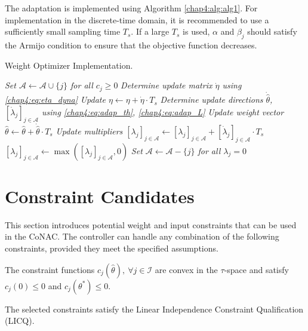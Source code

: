 The adaptation is implemented using Algorithm \ref{chap4:alg:alg1}. For implementation in the discrete-time domain, it is recommended to use a sufficiently small sampling time $T_s$. If a large $T_s$ is used, $\alpha$ and $\beta_j$ should satisfy the Armijo condition \cite[Chap.~3 eq.~(3.4)]{RN9} to ensure that the objective function decreases.

\begin{algorithm}[t]
    \caption{Weight Optimizer Implementation.}\label{chap4:alg:alg1}
        \BlankLine
        \emph{Set $\mathcal A \leftarrow \mathcal A\cup \{j\}$ for all $c_j\ge0$}\;
        \emph{Determine update matrix $\dot\eta$ using \eqref{chap4:eq:eta_dyna}}\;
        \emph{Update $\eta\leftarrow \eta +\dot\eta\cdot T_s$}\; 
        \emph{Determine update directions $\dot{\hat\theta}$, $[\dot\lambda_j]_{j\in\mathcal A}$ using \eqref{chap4:eq:adap_th}, \eqref{chap4:eq:adap_L}}\;
        \emph{Update weight vector $\hat\theta\leftarrow \hat\theta+\dot{\hat\theta}\cdot T_s$}\;
        \emph{Update multipliers $[\lambda_j]_{j\in\mathcal A}\leftarrow [\lambda_j]_{j\in\mathcal A}+[\dot\lambda_j]_{j\in\mathcal A}\cdot T_s$}\;
        \emph{$[\lambda_j]_{j\in\mathcal A}\leftarrow \max([\lambda_j]_{j\in\mathcal A}, 0)$}\;
        \emph{Set $\mathcal A \leftarrow \mathcal A - \{j\}$ for all $\lambda_j=0$}\;
\end{algorithm}

\section{Constraint Candidates} \label{chap4:sec:cstr_candidates}

This section introduces potential weight and input constraints that can be used in the CoNAC. The controller can handle any combination of the following constraints, provided they meet the specified assumptions.

\begin{assumption}
    The constraint functions $c_j(\hat\theta),\ \forall j\in\mathcal I$ are convex in the $\tau$-space and satisfy $c_j(0) \le 0$ and $c_j(\theta^*)\le 0$.
    \label{chap4:assum:assum1}
\end{assumption}

\begin{assumption}
    The selected constraints satisfy the Linear Independence Constraint Qualification (LICQ).
    \label{chap4:assum:assum2}
\end{assumption}

